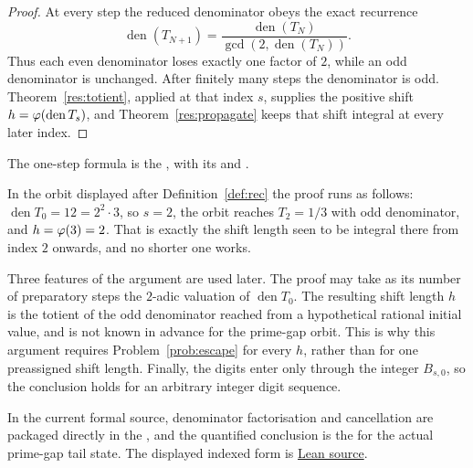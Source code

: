 \documentclass[11pt]{article}
\begin{document}
\begin{proof}
At every step the reduced denominator obeys the exact recurrence
\[
 \operatorname{den}(T_{N+1})
 =\frac{\operatorname{den}(T_N)}{\gcd(2,\operatorname{den}(T_N))}.
\]
Thus each even denominator loses exactly one factor of $2$, while an odd
denominator is unchanged.  After finitely many steps the denominator is odd.
Theorem~\ref{res:totient}, applied at that index $s$, supplies
the positive shift $h=\varphi(\operatorname{den}T_s)$, and
Theorem~\ref{res:propagate} keeps that shift integral at every later index.
\end{proof}

\noindent The one-step formula is the
,
with its
and
.

In the orbit displayed after Definition~\ref{def:rec} the proof runs as
follows: $\operatorname{den}T_0=12=2^{2}\cdot3$, so $s=2$, the orbit reaches
$T_2=1/3$ with odd denominator, and $h=\varphi(3)=2$.  That is exactly the shift
length seen to be integral there from index $2$ onwards, and no shorter one
works.

Three features of the argument are used later.  The proof may take as its
number of preparatory steps the $2$-adic valuation of
$\operatorname{den}T_0$.  The resulting shift length $h$ is the totient of the
odd denominator reached from a hypothetical rational initial value, and is
not known in advance for the prime-gap orbit.  This is why this argument
requires Problem~\ref{prob:escape} for every $h$, rather than for one
preassigned shift length.  Finally, the digits enter only through the integer
$B_{s,0}$, so the conclusion holds for an arbitrary integer digit sequence.

\noindent In the current formal source, denominator factorisation and
cancellation are packaged directly in the
, and the quantified conclusion is the
 for the actual prime-gap tail state.  The displayed
indexed form is \href{https://github.com/wcook04/plectis-erdos/blob/f36a98bf3d3e6f65f1074e3b800e3293d5b8a51a/ErdosProblems/Erdos251/PaperCoreR7.lean#L84}{Lean source}.
\end{document}
